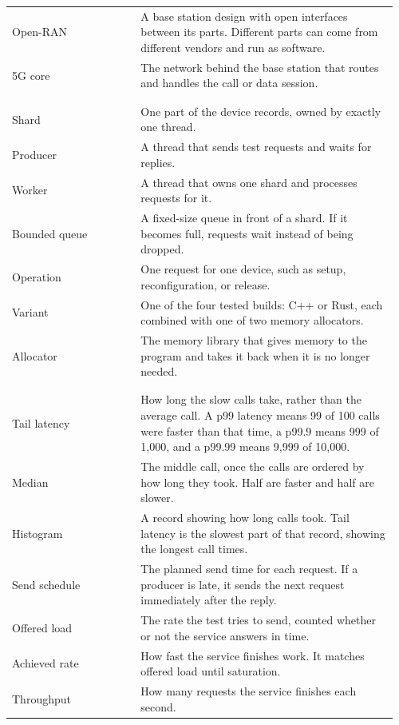 \documentclass[english,oneside,a4paper,censored,csm,software-track-2020]{HYthesisML}
\begin{document}
\begin{longtable}{@{}>{\scriptsize\raggedright\arraybackslash}p{0.32\linewidth} >{\scriptsize\raggedright\arraybackslash}p{0.64\linewidth}@{}}
Open-RAN & A base station design with open interfaces between its parts. Different parts can come from different vendors and run as software. \\
5G core & The network behind the base station that routes and handles the call or data session. \\
\\[2pt]
\multicolumn{2}{@{}l}{\scriptsize\emph{The service}}\\*[1pt]
Shard & One part of the device records, owned by exactly one thread. \\
Producer & A thread that sends test requests and waits for replies. \\
Worker & A thread that owns one shard and processes requests for it. \\
Bounded queue & A fixed-size queue in front of a shard. If it becomes full, requests wait instead of being dropped. \\
Operation & One request for one device, such as setup, reconfiguration, or release. \\
Variant & One of the four tested builds: C++ or Rust, each combined with one of two memory allocators. \\
Allocator & The memory library that gives memory to the program and takes it back when it is no longer needed. \\
\\[2pt]
\multicolumn{2}{@{}l}{\scriptsize\emph{Timing}}\\*[1pt]
Tail latency & How long the slow calls take, rather than the average call. A p99 latency means 99 of 100 calls were faster than that time, a p99.9 means 999 of 1,000, and a p99.99 means 9,999 of 10,000. \\
Median & The middle call, once the calls are ordered by how long they took. Half are faster and half are slower. \\
Histogram & A record showing how long calls took. Tail latency is the slowest part of that record, showing the longest call times. \\
Send schedule & The planned send time for each request. If a producer is late, it sends the next request immediately after the reply. \\
Offered load & The rate the test tries to send, counted whether or not the service answers in time. \\
Achieved rate & How fast the service finishes work. It matches offered load until saturation. \\
Throughput & How many requests the service finishes each second. \\

\end{longtable}
\end{document}
